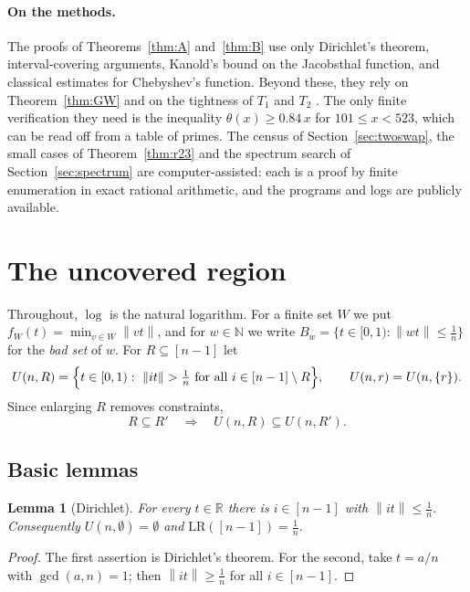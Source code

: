 \documentclass[11pt]{article}
\newtheorem{lemma}[theorem]{Lemma}
\theoremstyle{definition}
\newcommand{\LR}{\mathrm{LR}}
\newcommand{\N}{\mathbb{N}}
\newcommand{\norm}[1]{\left\lVert #1 \right\rVert}
\begin{document}
\paragraph{On the methods.} The proofs of Theorems~\ref{thm:A}
and~\ref{thm:B} use only Dirichlet's theorem, interval-covering
arguments, Kanold's bound on the Jacobsthal function, and classical
estimates for Chebyshev's function. Beyond these, they rely on
Theorem~\ref{thm:GW} and on the tightness of $T_1$ and $T_2$
\cite{Wills1968}. The only finite verification they need is the
inequality $\theta(x)\ge0.84\,x$ for $101\le x<523$, which can be read
off from a table of primes. The census of Section~\ref{sec:twoswap}, the
small cases of Theorem~\ref{thm:r23} and the spectrum search of
Section~\ref{sec:spectrum} are computer-assisted: each is
a proof by finite enumeration in exact rational arithmetic, and the
programs and logs are publicly available.

\section{The uncovered region}\label{sec:prelim}

Throughout, $\log$ is the natural logarithm. For a finite set $W$ we
put $f_W(t)=\min_{v\in W}\norm{vt}$, and for $w\in\N$ we write
$B_w=\{t\in[0,1):\norm{wt}\le\frac1n\}$ for the \emph{bad set} of $w$.
For $R\subseteq[n-1]$ let
\[
U(n,R)=\Bigl\{t\in[0,1):\ \norm{it}>\tfrac1n\ \text{for all }
i\in[n-1]\setminus R\Bigr\},\qquad U(n,r)=U(n,\{r\}).
\]
Since enlarging $R$ removes constraints,
\begin{equation}\label{eq:monotone}
R\subseteq R'\quad\Longrightarrow\quad U(n,R)\subseteq U(n,R').
\end{equation}

\subsection{Basic lemmas}

\begin{lemma}[Dirichlet]\label{lem:dir}
For every $t\in\mathbb R$ there is $i\in[n-1]$ with
$\norm{it}\le\frac1n$. Consequently $U(n,\emptyset)=\emptyset$ and
$\LR([n-1])=\frac1n$.
\end{lemma}

\begin{proof}
The first assertion is Dirichlet's theorem. For the second, take
$t=a/n$ with $\gcd(a,n)=1$; then $\norm{it}\ge\frac1n$ for all
$i\in[n-1]$.
\end{proof}
\end{document}
